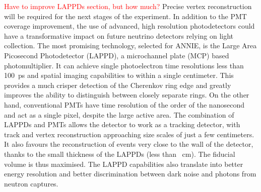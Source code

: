  \textcolor{red}{Have to improve LAPPDs section, but how much?}
 Precise vertex reconstruction will be required for the next stages of the experiment.
 In addition to the PMT coverage improvement, the use of advanced, high resolution photodetectors %
 could have a transformative impact on future neutrino detectors relying on light collection.
 The most promising technology, selected for ANNIE, is the Large Area Picosecond Photodetector %
 (LAPPD), a microchannel plate (MCP) based photomultiplier.
 It can achieve single photoelectron time resolutions less than 100~ps and spatial imaging %
 capabilities to within a single centimeter.
 This provides a much crisper detection of the Cherenkov ring edge and greatly improves the %
 ability to distinguish between closely separate rings.
 On the other hand, conventional PMTs have time resolution of the order of the nanosecond and act %
 as a single pixel, despite the large active area.
 The combination of LAPPDs and PMTs allows the detector to work as a tracking detector, %
 with track and vertex reconstruction approaching size scales of just a few centimeters.
 It also favours the reconstruction of events very close to the wall of the detector, %
 thanks to the small thickness of the LAPPDs (less than ~cm).
 The fiducial volume is thus maximised.
 The LAPPD capabilities also translate into better energy resolution and better discrimination %
 between dark noise and photons from neutron captures.

